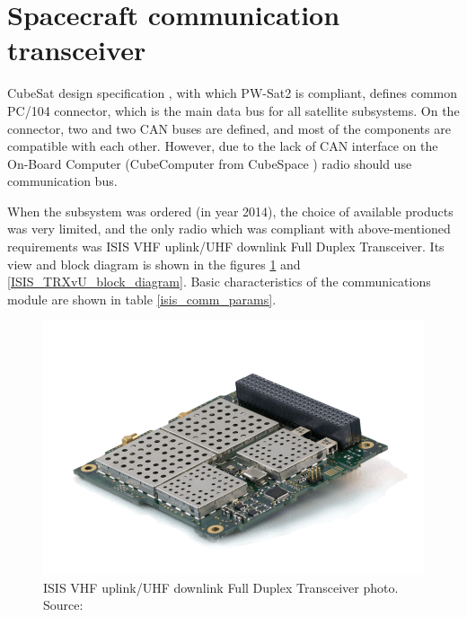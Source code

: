 
\section{Spacecraft communication transceiver}
\label{section:comm_design}
CubeSat design specification \cite{cubesat_spec}, with which PW-Sat2 is compliant, defines common PC/104 connector, which is the main data bus for all satellite subsystems. On the connector, two \iic and two CAN buses are defined, and most of the components are compatible with each other. However, due to the lack of CAN interface on the On-Board Computer (CubeComputer from CubeSpace \cite{cubespace_website}) radio should use \iic communication bus.

When the subsystem was ordered (in year \si{2014}), the choice of available products was very limited, and the only radio which was compliant with above-mentioned requirements was ISIS VHF uplink/UHF downlink Full Duplex Transceiver. Its view and block diagram is shown in the figures \ref{ISIS_TRXvU_photo} and \ref{ISIS_TRXvU_block_diagram}. Basic characteristics of the communications module are shown in table \ref{isis_comm_params}.

\begin{figure}[H]
    \centering
    \includegraphics[width=0.7\paperwidth]{img/6/ISIS-radio-UHF-VHF-min.png}
    \caption{ISIS VHF uplink/UHF downlink Full Duplex Transceiver photo. Source: \cite{isis_trxvu}}
    \label{ISIS_TRXvU_photo}
\end{figure}

